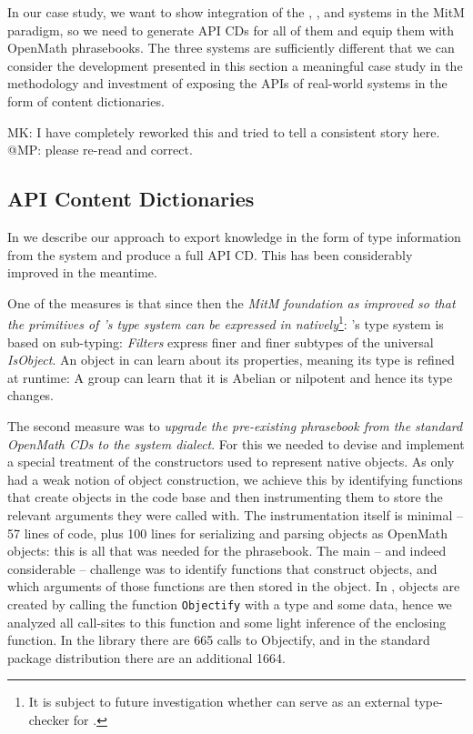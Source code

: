 In our case study, we want to show integration of the \GAP, \Singular, and \Sage systems
in the MitM paradigm, so we need to generate API CDs for all of them and equip them with
OpenMath phrasebooks. The three systems are sufficiently different that we can consider
the development presented in this section a meaningful case study in the methodology and
investment of exposing the APIs of real-world systems in the form of \OMMT content
dictionaries.

\begin{newpart}{MK: I have completely reworked this and tried to tell a consistent story
    here. @MP: please re-read and correct.}
\subsection{\GAP API Content Dictionaries}

In \cite{DehKohKon:iop16} we describe our approach to export knowledge in the form of type
information from the \GAP system and produce a full \GAP API CD. This has been
considerably improved in the meantime. 

One of the measures is that since then the \emph{MitM foundation as improved so that the primitives of \GAP's type system can be
  expressed in \OMMT natively}\footnote{It is subject to future investigation whether
  \MMT can serve as an external type-checker for \GAP.}: \GAP's type system is based on
sub-typing: \emph{Filters} express finer and finer subtypes of the universal
\emph{IsObject}. An object in \GAP can learn about its properties, meaning its type is
refined at runtime: A group can learn that it is Abelian or nilpotent and hence its type
changes.

The second measure was to \emph{upgrade the pre-existing \GAP phrasebook from the standard
  OpenMath CDs to the \GAP system dialect}. For this we needed to devise and implement a
special treatment of the \GAP constructors used to represent native \GAP objects. As \GAP
only had a weak notion of object construction, we achieve this by identifying functions
that create objects in the \GAP code base and then instrumenting them to store the
relevant arguments they were called with.  The instrumentation itself is minimal -- 57
lines of \GAP code, plus 100 lines for serializing and parsing \GAP objects as OpenMath
objects: this is all that was needed for the phrasebook.  The main -- and indeed
considerable -- challenge was to identify functions that construct objects, and which
arguments of those functions are then stored in the object.  In \GAP, objects are created
by calling the function \lstinline|Objectify| with a type and some data, hence we analyzed
all call-sites to this function and some light inference of the enclosing function. In the
\GAP library there are 665 calls to Objectify, and in the standard package distribution
there are an additional 1664.


\end{newpart}
